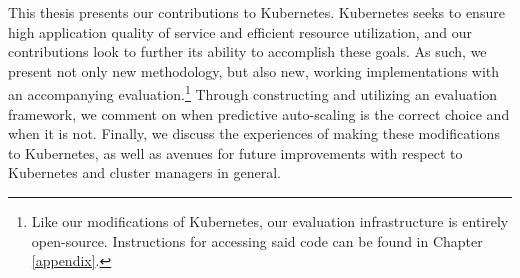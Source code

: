 This thesis presents our contributions to Kubernetes. Kubernetes seeks to
ensure high application quality of service and efficient resource utilization,
and our contributions look to further its ability to accomplish these
goals. As such, we present not only new methodology, but also new, working
implementations with an accompanying evaluation.\footnote{Like our modifications
of Kubernetes, our evaluation infrastructure is entirely open-source.
Instructions for accessing said code can be found in Chapter \ref{appendix}.}
Through constructing and utilizing an evaluation framework, we comment on when predictive
auto-scaling is the correct choice and when it is not. Finally, we
discuss the experiences of making these modifications to Kubernetes, as well as
avenues for future improvements with respect to Kubernetes and cluster managers in
general.

